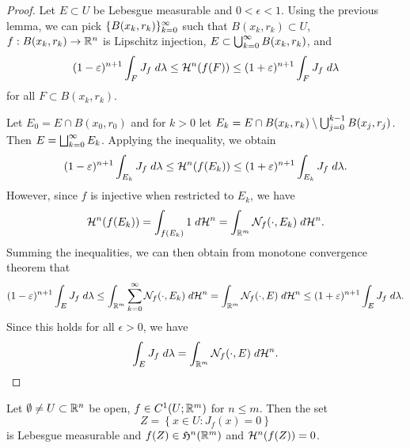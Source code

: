 \documentclass[a4paper]{article}
\begin{document}
\begin{proof}
Let $E \subset U$ be Lebesgue measurable and $0 < \epsilon < 1$.
Using the previous lemma, we can pick $\{ B(x_k, r_k) \}_{k=0}^\infty$
such that $B(x_k, r_k) \subset U$, $f : B(x_k, r_k) \to \mathbb{R}^n$
is Lipschitz injection, $E \subset \bigcup_{k=0}^\infty B(x_k, r_k)$, and
\[
(1 - \varepsilon)^{n+1} \int_F J_f \; d \lambda
\leq \mathcal{H}^n (f(F))
\leq (1 + \varepsilon)^{n+1} \int_F J_f \; d \lambda
\]
for all $F \subset B(x_k, r_k)$.

Let $E_0 = E \cap B(x_0, r_0)$ and for $k > 0$ let
$E_k = E \cap B(x_k, r_k) \setminus \bigcup_{j=0}^{k-1} B(x_j, r_j)$.
Then $E = \bigsqcup_{k=0}^\infty E_k$. Applying the inequality, we obtain
\[
(1 - \varepsilon)^{n+1} \int_{E_k} J_f \; d \lambda
\leq \mathcal{H}^n (f(E_k))
\leq (1 + \varepsilon)^{n+1} \int_{E_k} J_f \; d \lambda.
\]
However, since $f$ is injective when restricted to $E_k$,
we have
\[
\mathcal{H}^n (f(E_k))
= \int_{f(E_k)} 1 \; d \mathcal{H}^n
= \int_{\mathbb{R}^m} \mathcal{N}_f(\cdot, E_k) \; d \mathcal{H}^n.
\]
Summing the inequalities, we can then obtain from monotone
convergence theorem that
\[
(1 - \varepsilon)^{n+1} \int_E J_f \; d \lambda
\leq \int_{\mathbb{R}^m} \sum_{k=0}^\infty \mathcal{N}_f(\cdot, E_k) \; d \mathcal{H}^n
= \int_{\mathbb{R}^m} \mathcal{N}_f(\cdot, E) \; d \mathcal{H}^n
\leq (1 + \varepsilon)^{n+1} \int_E J_f \; d \lambda.
\]
Since this holds for all $\epsilon > 0$, we have
\[
\int_E J_f \; d \lambda = \int_{\mathbb{R}^m} \mathcal{N}_f(\cdot, E) \; d \mathcal{H}^n.
\]
\end{proof}

\begin{thm}
Let $\emptyset \neq U \subset \mathbb{R}^n$ be open, $f \in C^1 (U;
\mathbb{R}^m)$ for $n \leq m$. Then the set
\[
Z = \left\{ x \in U: J_f(x) = 0 \right\}
\]
is Lebesgue measurable and $f(Z) \in \mathfrak{H}^n(\mathbb{R}^m)$ and
$\mathcal{H}^n (f(Z)) = 0$.
\end{thm}
\end{document}
